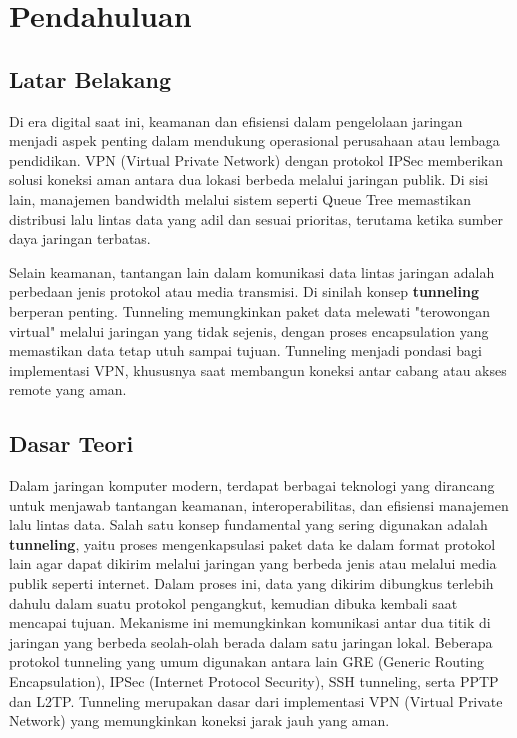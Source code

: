 \section{Pendahuluan}
\subsection{Latar Belakang}
Di era digital saat ini, keamanan dan efisiensi dalam pengelolaan jaringan menjadi aspek penting dalam mendukung operasional perusahaan atau lembaga pendidikan. VPN (Virtual Private Network) dengan protokol IPSec memberikan solusi koneksi aman antara dua lokasi berbeda melalui jaringan publik. Di sisi lain, manajemen bandwidth melalui sistem seperti Queue Tree memastikan distribusi lalu lintas data yang adil dan sesuai prioritas, terutama ketika sumber daya jaringan terbatas.

Selain keamanan, tantangan lain dalam komunikasi data lintas jaringan adalah perbedaan jenis protokol atau media transmisi. Di sinilah konsep \textbf{tunneling} berperan penting. Tunneling memungkinkan paket data melewati "terowongan virtual" melalui jaringan yang tidak sejenis, dengan proses encapsulation yang memastikan data tetap utuh sampai tujuan. Tunneling menjadi pondasi bagi implementasi VPN, khususnya saat membangun koneksi antar cabang atau akses remote yang aman.

\subsection{Dasar Teori}

Dalam jaringan komputer modern, terdapat berbagai teknologi yang dirancang untuk menjawab tantangan keamanan, interoperabilitas, dan efisiensi manajemen lalu lintas data. Salah satu konsep fundamental yang sering digunakan adalah \textbf{tunneling}, yaitu proses mengenkapsulasi paket data ke dalam format protokol lain agar dapat dikirim melalui jaringan yang berbeda jenis atau melalui media publik seperti internet. Dalam proses ini, data yang dikirim dibungkus terlebih dahulu dalam suatu protokol pengangkut, kemudian dibuka kembali saat mencapai tujuan. Mekanisme ini memungkinkan komunikasi antar dua titik di jaringan yang berbeda seolah-olah berada dalam satu jaringan lokal. Beberapa protokol tunneling yang umum digunakan antara lain GRE (Generic Routing Encapsulation), IPSec (Internet Protocol Security), SSH tunneling, serta PPTP dan L2TP. Tunneling merupakan dasar dari implementasi VPN (Virtual Private Network) yang memungkinkan koneksi jarak jauh yang aman.

